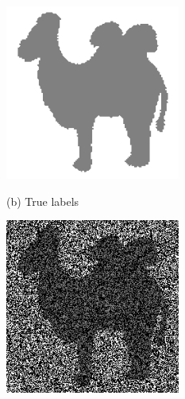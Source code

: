 \documentclass{article}
\begin{document}
\begin{figure}[htb]
\begin{minipage}[b]{.30\linewidth}
      \centerline{\includegraphics[width=\textwidth, cfbox=black 1pt 0pt]{ress/camel60/camel60_label.png}}
      \centerline{(b) True labels}\medskip
    \end{minipage}
    \hfill
    \begin{minipage}[b]{0.30\linewidth}
      \centering
      \centerline{\includegraphics[width=\textwidth,cfbox=black 1pt 0pt]{ress/camel60/camel60_miss.png}}

\end{minipage}
\end{figure}
\end{document}
